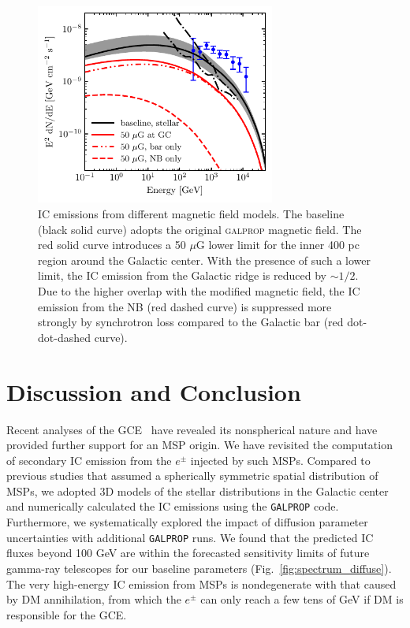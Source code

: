 \documentclass[doublespace,nopageskip]{VTthesis} %
\begin{document}
\begin{figure}[htb]
    \centering
    \includegraphics[width=0.7\textwidth]{Figures/IC_MSPs/ics_spectrum_bfields.pdf}
    \caption{IC emissions from different magnetic field models. The baseline (black solid curve) adopts the original \textsc{galprop} magnetic field. The red solid curve introduces a 50 $\mu$G lower limit for the inner 400 pc region around the Galactic center. With the presence of such a lower limit, the IC emission from the Galactic ridge is reduced by $\sim 1/2$. Due to the higher overlap with the modified magnetic field, the IC emission from the NB (red dashed curve) is suppressed more strongly by synchrotron loss compared to the Galactic bar (red dot-dot-dashed curve).}
    \label{fig:spectrum_bfields}
\end{figure}

\section{\label{sec:conclu}Discussion and Conclusion}

Recent analyses of the GCE~\cite{Macias:2016nev,Bartels:2017vsx,Macias:2019omb} have revealed its nonspherical nature and have provided further support for an MSP origin. We have revisited the computation of secondary IC emission from the $e^\pm$ injected by such MSPs. Compared to previous studies that assumed a spherically symmetric spatial distribution of MSPs, we adopted 3D models of the stellar distributions in the Galactic center and numerically calculated the IC emissions using the {\tt GALPROP} code. Furthermore, we systematically explored the impact of diffusion parameter uncertainties with additional {\tt GALPROP} runs. We found that the predicted IC fluxes beyond 100 GeV are within the forecasted sensitivity limits of future gamma-ray telescopes for our baseline parameters (Fig.~\ref{fig:spectrum_diffuse}). The very high-energy IC emission from MSPs is nondegenerate with that caused by DM annihilation, from which the $e^\pm$ can only reach a few tens of GeV if DM is responsible for the GCE.
\end{document}
